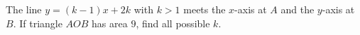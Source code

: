The line $y=(k-1)x+2k$ with $k>1$ meets the $x$-axis at $A$ and the $y$-axis at $B$. If triangle $AOB$ has area $9$, find all possible $k$.
